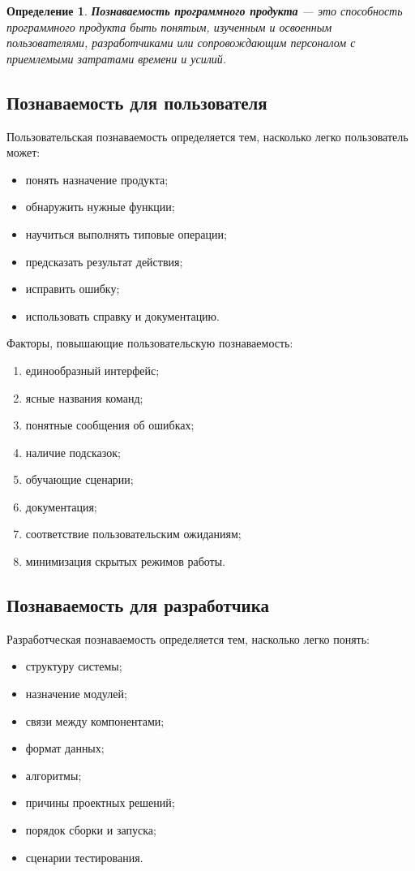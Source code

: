 \documentclass[12pt,a4paper]{article}
\newtheorem{definition}{Определение}
\begin{document}
\begin{definition}
\textbf{Познаваемость программного продукта} --- это способность программного продукта быть понятым, изученным и освоенным пользователями, разработчиками или сопровождающим персоналом с приемлемыми затратами времени и усилий.
\end{definition}

\subsection{Познаваемость для пользователя}

Пользовательская познаваемость определяется тем, насколько легко пользователь может:
\begin{itemize}
    \item понять назначение продукта;
    \item обнаружить нужные функции;
    \item научиться выполнять типовые операции;
    \item предсказать результат действия;
    \item исправить ошибку;
    \item использовать справку и документацию.
\end{itemize}

Факторы, повышающие пользовательскую познаваемость:
\begin{enumerate}
    \item единообразный интерфейс;
    \item ясные названия команд;
    \item понятные сообщения об ошибках;
    \item наличие подсказок;
    \item обучающие сценарии;
    \item документация;
    \item соответствие пользовательским ожиданиям;
    \item минимизация скрытых режимов работы.
\end{enumerate}

\subsection{Познаваемость для разработчика}

Разработческая познаваемость определяется тем, насколько легко понять:
\begin{itemize}
    \item структуру системы;
    \item назначение модулей;
    \item связи между компонентами;
    \item формат данных;
    \item алгоритмы;
    \item причины проектных решений;
    \item порядок сборки и запуска;
    \item сценарии тестирования.
\end{itemize}
\end{document}
